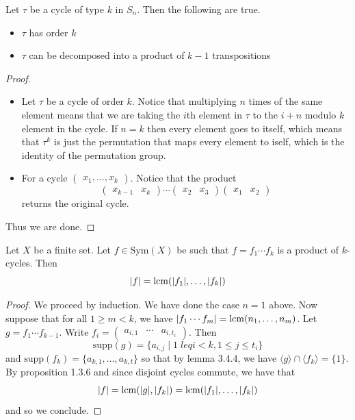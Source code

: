 \documentclass[a4paper]{article}
\begin{document}
\begin{prp}{}{} Let $\tau$ be a cycle of type $k$ in $S_n$. Then the following are true. 
\begin{itemize}
\item $\tau$ has order $k$
\item $\tau$ can be decomposed into a product of $k-1$ transpositions
\end{itemize}\tcbline
\begin{proof}~\\
\begin{itemize}
\item Let $\tau$ be a cycle of order $k$. Notice that multiplying $n$ times of the same element means that we are taking the $i$th element in $\tau$ to the $i+n$ modulo $k$ element in the cycle. If $n=k$ then every element goes to itself, which means that $\tau^k$ is just the permutation that maps every element to iself, which is the identity of the permutation group. 
\item For a cycle $\begin{pmatrix}x_1,\dots,x_k\end{pmatrix}$. Notice that the product $$\begin{pmatrix}x_{k-1}&x_k\end{pmatrix}\cdots\begin{pmatrix}x_2&x_3\end{pmatrix}\begin{pmatrix}x_1&x_2\end{pmatrix}$$ returns the original cycle. 
\end{itemize}
Thus we are done. 
\end{proof}
\end{prp}

\begin{prp}{}{} Let $X$ be a finite set. Let $f\in\text{Sym}(X)$ be such that $f=f_1\cdots f_k$ is a product of $k$-cycles. Then $$\abs{f}=\operatorname{lcm}(\abs{f_1},\dots,\abs{f_k})$$ \tcbline
\begin{proof}
We proceed by induction. We have done the case $n=1$ above. Now suppose that for all $1\geq m<k$, we have $\abs{f_1\cdots f_m}=\operatorname{lcm}(n_1,\dots,n_m)$. Let $g=f_1\cdots f_{k-1}$. Write $f_i=\begin{pmatrix}a_{i,1}&\cdots&a_{i,t_i}\end{pmatrix}$. Then $$\text{supp}(g)=\{a_{i,j}\;|\;1\;leq i<k, 1\leq j\leq t_i\}$$ and $\text{supp}(f_k)=\{a_{k,1},\dots,a_{k,t}\}$ so that by lemma 3.4.4, we have $\langle g\rangle\cap\langle f_k\rangle=\{1\}$. By proposition 1.3.6 and since disjoint cycles commute, we have that $$\abs{f}=\operatorname{lcm}(\abs{g},\abs{f_k})=\operatorname{lcm}(\abs{f_1},\dots,\abs{f_k})$$ and so we conclude. 
\end{proof}
\end{prp}
\end{document}
